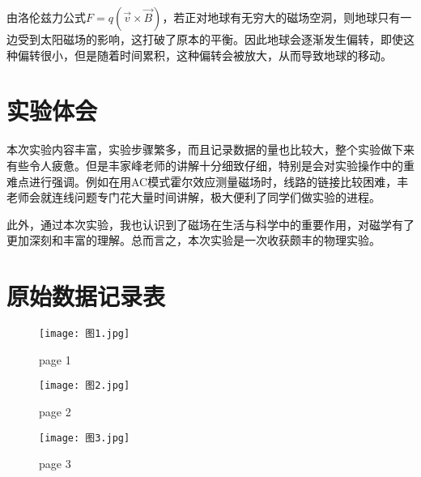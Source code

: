 \documentclass[11pt]{article}
\begin{document}
由洛伦兹力公式$F = q (\vec{v} \times \vec{B})$，若正对地球有无穷大的磁场空洞，则地球只有一边受到太阳磁场的影响，这打破了原本的平衡。因此地球会逐渐发生偏转，即使这种偏转很小，但是随着时间累积，这种偏转会被放大，从而导致地球的移动。

\section{实验体会}

本次实验内容丰富，实验步骤繁多，而且记录数据的量也比较大，整个实验做下来有些令人疲惫。但是丰家峰老师的讲解十分细致仔细，特别是会对实验操作中的重难点进行强调。例如在用AC模式霍尔效应测量磁场时，线路的链接比较困难，丰老师会就连线问题专门花大量时间讲解，极大便利了同学们做实验的进程。

此外，通过本次实验，我也认识到了磁场在生活与科学中的重要作用，对磁学有了更加深刻和丰富的理解。总而言之，本次实验是一次收获颇丰的物理实验。


\section{原始数据记录表}

\begin{figure}[htbp]
  \centering
  \texttt{[image: 图1.jpg]}
\caption{page 1}
\end{figure}

\begin{figure}[htbp]
  \centering
  \texttt{[image: 图2.jpg]}
\caption{page 2}
\end{figure}

\begin{figure}[htbp]
  \centering
  \texttt{[image: 图3.jpg]}
\caption{page 3}
\end{figure}
\end{document}
